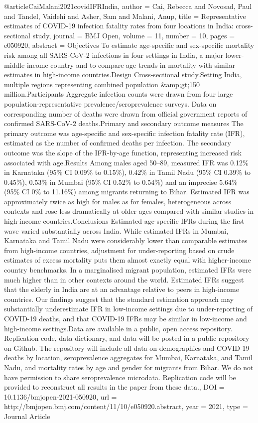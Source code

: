 {{{{@article{CaiMalani2021covidIFRIndia,
   author = {Cai, Rebecca and Novosad, Paul and Tandel, Vaidehi and Asher, Sam and Malani, Anup},
   title = {Representative estimates of COVID-19 infection fatality rates from four locations in India: cross-sectional study},
   journal = {BMJ Open},
   volume = {11},
   number = {10},
   pages = {e050920},
   abstract = {Objectives To estimate age-specific and sex-specific mortality risk among all SARS-CoV-2 infections in four settings in India, a major lower-middle-income country and to compare age trends in mortality with similar estimates in high-income countries.Design Cross-sectional study.Setting India, multiple regions representing combined population &amp;gt;150 million.Participants Aggregate infection counts were drawn from four large population-representative prevalence/seroprevalence surveys. Data on corresponding number of deaths were drawn from official government reports of confirmed SARS-CoV-2 deaths.Primary and secondary outcome measures The primary outcome was age-specific and sex-specific infection fatality rate (IFR), estimated as the number of confirmed deaths per infection. The secondary outcome was the slope of the IFR-by-age function, representing increased risk associated with age.Results Among males aged 50–89, measured IFR was 0.12\% in Karnataka (95\% CI 0.09\% to 0.15\%), 0.42\% in Tamil Nadu (95\% CI 0.39\% to 0.45\%), 0.53\% in Mumbai (95\% CI 0.52\% to 0.54\%) and an imprecise 5.64\% (95\% CI 0\% to 11.16\%) among migrants returning to Bihar. Estimated IFR was approximately twice as high for males as for females, heterogeneous across contexts and rose less dramatically at older ages compared with similar studies in high-income countries.Conclusions Estimated age-specific IFRs during the first wave varied substantially across India. While estimated IFRs in Mumbai, Karnataka and Tamil Nadu were considerably lower than comparable estimates from high-income countries, adjustment for under-reporting based on crude estimates of excess mortality puts them almost exactly equal with higher-income country benchmarks. In a marginalised migrant population, estimated IFRs were much higher than in other contexts around the world. Estimated IFRs suggest that the elderly in India are at an advantage relative to peers in high-income countries. Our findings suggest that the standard estimation approach may substantially underestimate IFR in low-income settings due to under-reporting of COVID-19 deaths, and that COVID-19 IFRs may be similar in low-income and high-income settings.Data are available in a public, open access repository. Replication code, data dictionary, and data will be posted in a public repository on Github. The repository will include all data on demographics and COVID-19 deaths by location, seroprevalence aggregates for Mumbai, Karnataka, and Tamil Nadu, and mortality rates by age and gender for migrants from Bihar. We do not have permission to share seroprevalence microdata. Replication code will be provided to reconstruct all results in the paper from these data.},
   DOI = {10.1136/bmjopen-2021-050920},
   url = {http://bmjopen.bmj.com/content/11/10/e050920.abstract},
   year = {2021},
   type = {Journal Article}
}

}}}}
